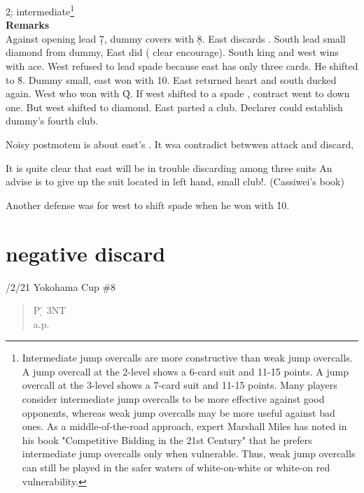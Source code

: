 
2\d : intermediate\footnote{
Intermediate jump overcalls are more constructive than weak jump overcalls. A jump overcall at the 2-level shows a 6-card suit and 11-15 points. A jump overcall at the 3-level shows a 7-card suit and 11-15 points.
Many players consider intermediate jump overcalls to be more effective against good opponents, whereas weak jump overcalls may be more useful against bad ones. As a middle-of-the-road approach, expert Marshall Miles has noted in his book "Competitive Bidding in the 21st Century" that he prefers intermediate jump overcalls only when vulnerable. Thus, weak jump overcalls can still be played in the safer waters of white-on-white or white-on red vulnerability.}\\

{\bf Remarks}\\

Against opening lead \d 7, dummy covers with \d 8. East discards .
South lead small diamond from dummy, East did ( clear encourage).
South king and west wins with ace. West refused to lead spade because
east has only three cards. He shifted to \h 8. Dummy small, east won
with 10. East returned heart and south ducked again. West who won
with \h Q. If west shifted to a spade , contract went to down one.
But west shifted to diamond. East parted a club. Declarer could
establish dummy's fourth club.

Noisy postmotem is about east's . It wsa contradict betwwen
attack and discard,

It is quite clear that east will be in trouble discarding 
among three suits An advise is to give up the suit located in
left hand, small club!. (Cassiwei's book)


 Another defense was for west to shift spade when he won with \h10.





\section{negative discard}

/2/21 Yokohama Cup \#8
\begin{quote}
%
  {}%
  {}
  {}%
  {}%
\end{quote}
\begin{quote}
\begin{bidding}
P \d   {}\h  \> 3NT\\
a.p.
\end{bidding}
\end{quote}

